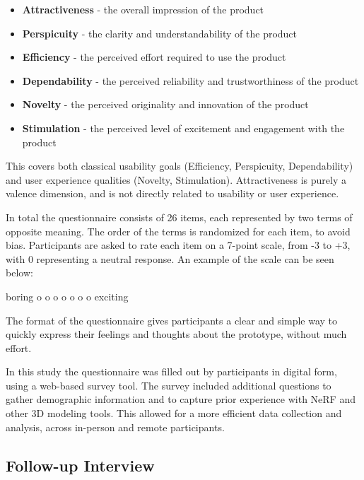 \begin{itemize}
  \item \textbf{Attractiveness} - the overall impression of the product
  \item \textbf{Perspicuity} - the clarity and understandability of the product
  \item \textbf{Efficiency} - the perceived effort required to use the product
  \item \textbf{Dependability} - the perceived reliability and trustworthiness of the product
  \item \textbf{Novelty} - the perceived originality and innovation of the product
  \item \textbf{Stimulation} - the perceived level of excitement and engagement with the product
\end{itemize}

This covers both classical usability goals (Efficiency, Perspicuity, Dependability) and user experience qualities (Novelty, Stimulation).
Attractiveness is purely a valence dimension, and is not directly related to usability or user experience.

In total the questionnaire consists of 26 items, each represented by two terms of opposite meaning. 
The order of the terms is randomized for each item, to avoid bias.
Participants are asked to rate each item on a 7-point scale, from -3 to +3, with 0 representing a neutral response.
An example of the scale can be seen below:

\begin{center}
  boring \quad o o o o o o o \quad exciting
\end{center}

The format of the questionnaire gives participants a clear and simple way to  quickly express their feelings and thoughts about the prototype, without much effort.

In this study the questionnaire was filled out by participants in digital form, using a web-based survey tool. %
The survey included additional questions to gather demographic information and to capture prior experience with NeRF and other 3D modeling tools.
This allowed for a more efficient data collection and analysis, across in-person and remote participants.

\subsection*{Follow-up Interview}
\label{sec:methodology:study:interview}

